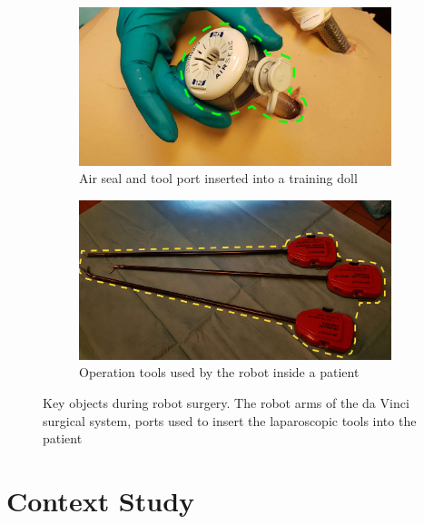 \documentclass[conference]{IEEEtran}
\begin{document}
\begin{figure}
	\begin{subfigure}[b]{0.24\textwidth}
		\includegraphics[width=\textwidth]{Figures/port.pdf}
		\caption{Air seal and tool port inserted into a training doll}
		\label{fig:port}
	\end{subfigure}
	\begin{subfigure}[b]{0.24\textwidth}
		\includegraphics[width=\textwidth]{Figures/tools.pdf}
		\caption{Operation tools used by the robot inside a patient}
		\label{fig:tools}
	\end{subfigure}
	\caption{Key objects during robot surgery. The robot arms of the da Vinci surgical system, ports used to insert the laparoscopic tools into the patient}
	\label{Fig:fieldresult}
\end{figure}

\section{Context Study}
\end{document}
